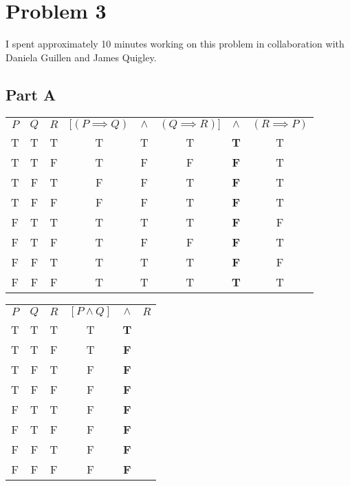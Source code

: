 \documentclass{article}
\begin{document}
\section*{Problem 3}

I spent approximately 10 minutes working on this problem in collaboration with
Daniela Guillen and James Quigley.

\subsection*{Part A}

\begin{center}
  \begin{tabular}{ c c c c c c c c }
    $P$ & $Q$ & $R$ & $[(P \implies Q)$ & $\land$ & $(Q \implies R)]$ & $\land$ &
    $(R \implies P)$ \\
    T & T & T & T & T & T & \textbf{T} & T \\
    T & T & F & T & F & F & \textbf{F} & T \\
    T & F & T & F & F & T & \textbf{F} & T \\
    T & F & F & F & F & T & \textbf{F} & T \\
    F & T & T & T & T & T & \textbf{F} & F \\
    F & T & F & T & F & F & \textbf{F} & T \\
    F & F & T & T & T & T & \textbf{F} & F \\
    F & F & F & T & T & T & \textbf{T} & T \\
  \end{tabular}
\end{center}

\begin{center}
  \begin{tabular}{ c c c c c c }
    $P$ & $Q$ & $R$ & $[P \land Q]$ & $\land$ & $R$ \\
    T & T & T & T & \textbf{T} &  \\
    T & T & F & T & \textbf{F} &  \\
    T & F & T & F & \textbf{F} &  \\
    T & F & F & F & \textbf{F} &  \\
    F & T & T & F & \textbf{F} &  \\
    F & T & F & F & \textbf{F} &  \\
    F & F & T & F & \textbf{F} &  \\
    F & F & F & F & \textbf{F} &  \\
  \end{tabular}
\end{center}
\end{document}
